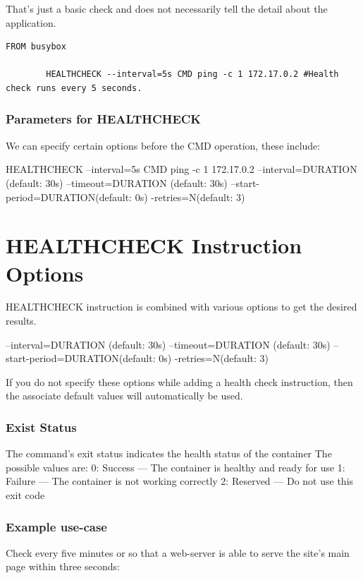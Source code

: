 \documentclass[11pt]{book}
\begin{document}
    That's just a basic check and does not necessarily tell the detail about the application.

    \begin{lstlisting}[style=dockerstyle,caption={Example Dockerfile}]
        FROM busybox

        HEALTHCHECK --interval=5s CMD ping -c 1 172.17.0.2 #Health check runs every 5 seconds.
    \end{lstlisting}

    \subsubsection{Parameters for HEALTHCHECK}
    We can specify certain options before the CMD operation, these include:

    HEALTHCHECK --interval=5s CMD ping -c 1 172.17.0.2
    --interval=DURATION (default: 30s)
    --timeout=DURATION (default: 30s)
    --start-period=DURATION(default: 0s)
    -retries=N(default: 3)

    \section{HEALTHCHECK Instruction Options}
    HEALTHCHECK instruction is combined with various options to get the desired results.


    --interval=DURATION (default: 30s)
    --timeout=DURATION (default: 30s)
    --start-period=DURATION(default: 0s)
    -retries=N(default: 3)

    If you do not specify these options while adding a health check instruction, then the associate default values will automatically be used.

    \subsubsection{Exist Status}
    The command's exit status indicates the health status of the container The possible values are:
    0: Success --- The container is healthy and ready for use
    1: Failure --- The container is not working correctly
    2: Reserved --- Do not use this exit code

    \subsubsection{Example use-case}
    Check every five minutes or so that a web-server is able to serve the site's main page within three seconds:
\end{document}
